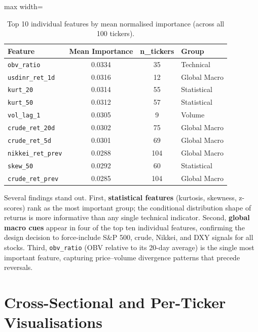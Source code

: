 \begin{table}[H]
\centering
\caption{Top 10 individual features by mean normalised importance (across all 100 tickers).}
\label{tab:top_features}
\renewcommand{\arraystretch}{1.3}
\begin{adjustbox}{max width=\textwidth}
\begin{tabular}{l c c l}
\toprule
\textbf{Feature} & \textbf{Mean Importance} & \textbf{n\_tickers} & \textbf{Group} \\
\midrule
\texttt{obv\_ratio}        & 0.0334 & 35  & Technical \\
\texttt{usdinr\_ret\_1d}   & 0.0316 & 12  & Global Macro \\
\texttt{kurt\_20}          & 0.0314 & 55  & Statistical \\
\texttt{kurt\_50}          & 0.0312 & 57  & Statistical \\
\texttt{vol\_lag\_1}       & 0.0305 & 9   & Volume \\
\texttt{crude\_ret\_20d}   & 0.0302 & 75  & Global Macro \\
\texttt{crude\_ret\_5d}    & 0.0301 & 69  & Global Macro \\
\texttt{nikkei\_ret\_prev} & 0.0288 & 104 & Global Macro \\
\texttt{skew\_50}          & 0.0292 & 60  & Statistical \\
\texttt{crude\_ret\_prev}  & 0.0285 & 104 & Global Macro \\
\bottomrule
\end{tabular}
\end{adjustbox}
\end{table}

Several findings stand out. First, \textbf{statistical features} (kurtosis, skewness, z-scores) rank as the most important group; the conditional distribution shape of returns is more informative than any single technical indicator. Second, \textbf{global macro cues} appear in four of the top ten individual features, confirming the design decision to force-include S\&P 500, crude, Nikkei, and DXY signals for all stocks. Third, \texttt{obv\_ratio} (OBV relative to its 20-day average) is the single most important feature, capturing price--volume divergence patterns that precede reversals.

\section{Cross-Sectional and Per-Ticker Visualisations}

